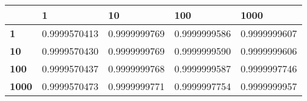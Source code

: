\begin{tabular}{|l|l|l|l|l|}
\hline
&\textbf{1}&\textbf{10}&\textbf{100}&\textbf{1000}\\\hline
\textbf{1}&0.9999570413&0.9999999769&0.9999999586&0.9999999607\\\hline
\textbf{10}&0.9999570430&0.9999999769&0.9999999590&0.9999999606\\\hline
\textbf{100}&0.9999570437&0.9999999768&0.9999999587&0.9999997746\\\hline
\textbf{1000}&0.9999570473&0.9999999771&0.9999997754&0.9999999957\\\hline
\end{tabular}
